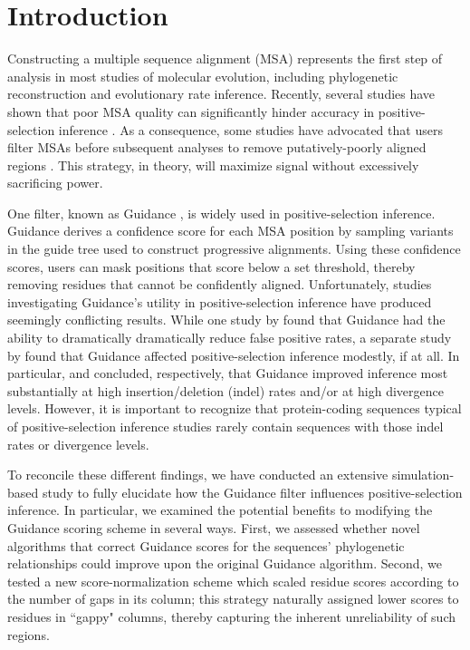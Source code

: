 \documentclass[11pt]{article}
\begin{document}
\section*{Introduction}
Constructing a multiple sequence alignment (MSA) represents the first step of analysis in most studies of molecular evolution, including phylogenetic reconstruction and evolutionary rate inference. Recently, several studies have shown that poor MSA quality can significantly hinder accuracy in positive-selection inference  \citep{Schneider2009, Fletcher2010, MarkovaRaina2011}. As a consequence, some studies have advocated that users filter MSAs before subsequent analyses to remove putatively-poorly aligned regions \citep{Jordan2012,Privman2012}. This strategy, in theory, will maximize signal without excessively sacrificing power.

One filter, known as Guidance \citep{Penn2010}, is widely used in positive-selection inference. Guidance derives a confidence score for each MSA position by sampling variants in the guide tree used to construct progressive alignments. Using these confidence scores, users can mask positions that score below a set threshold, thereby removing residues that cannot be confidently aligned. Unfortunately, studies investigating Guidance's utility in positive-selection inference have produced seemingly conflicting results. While one study by \citet{Privman2012} found that Guidance had the ability to dramatically dramatically reduce false positive rates, a separate study by \citet{Jordan2012} found that Guidance affected positive-selection inference modestly, if at all. 
In particular, \citet{Privman2012} and \citet{Jordan2012} concluded, respectively, that Guidance improved inference most substantially at high insertion/deletion (indel) rates and/or at high divergence levels. However, it is important to recognize that protein-coding sequences typical of positive-selection inference studies rarely contain sequences with those indel rates or divergence levels.

To reconcile these different findings, we have conducted an extensive simulation-based study to fully elucidate how the Guidance filter influences positive-selection inference. In particular, we examined the potential benefits to modifying the Guidance scoring scheme in several ways. First, we assessed whether novel algorithms that correct Guidance scores for the sequences' phylogenetic relationships could improve upon the original Guidance algorithm. Second, we tested a new score-normalization scheme which scaled residue scores according to the number of gaps in its column; this strategy naturally assigned lower scores to residues in ``gappy" columns, thereby capturing the inherent unreliability of such regions. 
\end{document}
